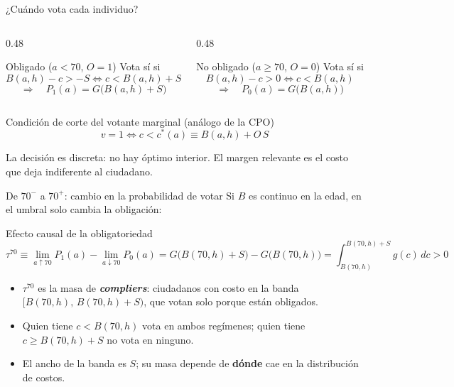 \documentclass[aspectratio=169,11pt,xcolor=table]{beamer}
\newcommand{\itemgap}{1.3em}
\newcommand{\hl}[1]{\textcolor{upaccent}{\textbf{#1}}}
\begin{document}
\begin{frame}{¿Cuándo vota cada individuo?}
  \begin{columns}[T]
    \begin{column}{0.48\textwidth}
      \begin{block}{Obligado ($a<70$, $O=1$)}
        \small Vota sí si
        \[ B(a,h)-c>-S \iff c<B(a,h)+S \]
        \vspace{-0.3cm}
        \[ \Rightarrow\quad P_1(a)=G\big(B(a,h)+S\big) \]
      \end{block}
    \end{column}
    \begin{column}{0.48\textwidth}
      \begin{block}{No obligado ($a\ge 70$, $O=0$)}
        \small Vota sí si
        \[ B(a,h)-c>0 \iff c<B(a,h) \]
        \vspace{-0.3cm}
        \[ \Rightarrow\quad P_0(a)=G\big(B(a,h)\big) \]
      \end{block}
    \end{column}
  \end{columns}
  \vspace{0.35cm}
  \begin{block}{Condición de corte del votante marginal (análogo de la CPO)}
    \[ v=1 \iff c< c^*(a)\equiv B(a,h)+O\,S \]
  \end{block}
  {\scriptsize\color{upgray} La decisión es discreta: no hay óptimo interior. El margen relevante es el costo que deja indiferente al ciudadano.\par}
\end{frame}

\begin{frame}{De $70^-$ a $70^+$: cambio en la probabilidad de votar}
  \small Si $B$ es continuo en la edad, en el umbral solo cambia la obligación:
  \begin{block}{Efecto causal de la obligatoriedad}
    \[ \tau^{70}\equiv\lim_{a\uparrow 70}P_1(a)-\lim_{a\downarrow 70}P_0(a)=G\big(B(70,h)+S\big)-G\big(B(70,h)\big)=\int_{B(70,h)}^{B(70,h)+S} g(c)\,dc>0 \]
  \end{block}
  \vspace{0.15cm}
  \renewcommand{\itemgap}{0.6em}
  \begin{itemize}
    \item $\tau^{70}$ es la masa de \hl{\textit{compliers}}: ciudadanos con costo en la banda $\big[B(70,h),\,B(70,h)+S\big)$, que votan solo porque están obligados.
    \item Quien tiene $c<B(70,h)$ vota en ambos regímenes; quien tiene $c\ge B(70,h)+S$ no vota en ninguno.
    \item El ancho de la banda es $S$; su masa depende de \textbf{dónde} cae en la distribución de costos.
  \end{itemize}
\end{frame}
\end{document}
